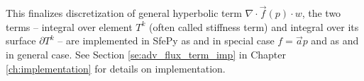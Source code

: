 This finalizes discretization of general hyperbolic term 
$\nabla\cdot\vec{f}(p) 
\cdot w$, the two terms -- integral over element $T^k$ (often called stiffness 
term) and integral over its surface $\partial T^k$ -- are implemented in SfePy 
as  and  in special 
case $f = \vec{a}p$ and as  and 
 in general case. See Section 
\ref{se:adv_flux_term_imp} in Chapter \ref{ch:implementation} for details on 
implementation.





